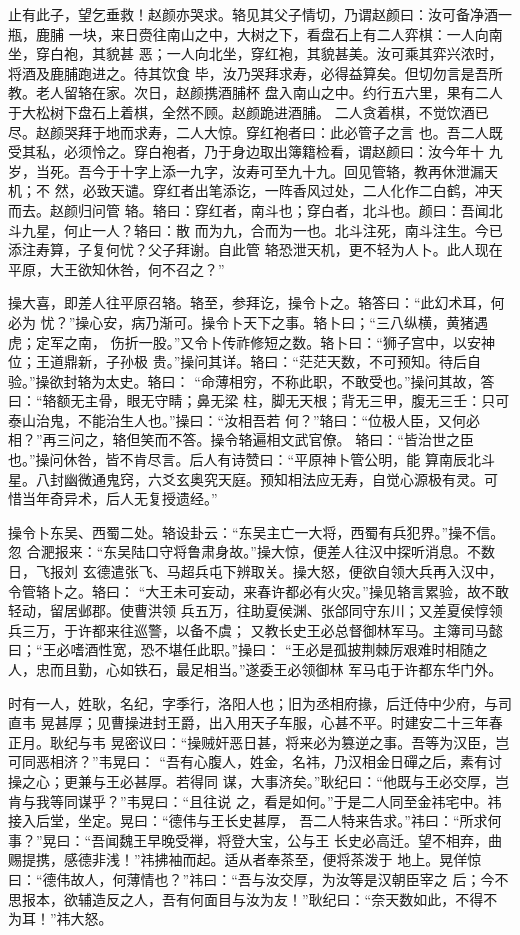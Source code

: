 止有此子，望乞垂救！赵颜亦哭求。辂见其父子情切，乃谓赵颜曰：汝可备净酒一瓶，鹿脯
一块，来日赍往南山之中，大树之下，看盘石上有二人弈棋：一人向南坐，穿白袍，其貌甚
恶；一人向北坐，穿红袍，其貌甚美。汝可乘其弈兴浓时，将酒及鹿脯跑进之。待其饮食
毕，汝乃哭拜求寿，必得益算矣。但切勿言是吾所教。老人留辂在家。次日，赵颜携酒脯杯
盘入南山之中。约行五六里，果有二人于大松树下盘石上着棋，全然不顾。赵颜跪进酒脯。
二人贪着棋，不觉饮酒已尽。赵颜哭拜于地而求寿，二人大惊。穿红袍者曰：此必管子之言
也。吾二人既受其私，必须怜之。穿白袍者，乃于身边取出簿籍检看，谓赵颜曰：汝今年十
九岁，当死。吾今于十字上添一九字，汝寿可至九十九。回见管辂，教再休泄漏天机；不
然，必致天谴。穿红者出笔添讫，一阵香风过处，二人化作二白鹤，冲天而去。赵颜归问管
辂。辂曰：穿红者，南斗也；穿白者，北斗也。颜曰：吾闻北斗九星，何止一人？辂曰：散
而为九，合而为一也。北斗注死，南斗注生。今已添注寿算，子复何忧？父子拜谢。自此管
辂恐泄天机，更不轻为人卜。此人现在平原，大王欲知休咎，何不召之？”

操大喜，即差人往平原召辂。辂至，参拜讫，操令卜之。辂答曰：“此幻术耳，何必为
忧？”操心安，病乃渐可。操令卜天下之事。辂卜曰；“三八纵横，黄猪遇虎；定军之南，
伤折一股。”又令卜传祚修短之数。辂卜曰：“狮子宫中，以安神位；王道鼎新，子孙极
贵。”操问其详。辂曰：“茫茫天数，不可预知。待后自验。”操欲封辂为太史。辂曰：
“命薄相穷，不称此职，不敢受也。”操问其故，答曰：“辂额无主骨，眼无守睛；鼻无梁
柱，脚无天根；背无三甲，腹无三壬：只可泰山治鬼，不能治生人也。”操曰：“汝相吾若
何？”辂曰：“位极人臣，又何必相？”再三问之，辂但笑而不答。操令辂遍相文武官僚。
辂曰：“皆治世之臣也。”操问休咎，皆不肯尽言。后人有诗赞曰：“平原神卜管公明，能
算南辰北斗星。八封幽微通鬼窍，六爻玄奥究天庭。预知相法应无寿，自觉心源极有灵。可
惜当年奇异术，后人无复授遗经。”

操令卜东吴、西蜀二处。辂设卦云：“东吴主亡一大将，西蜀有兵犯界。”操不信。忽
合淝报来：“东吴陆口守将鲁肃身故。”操大惊，便差人往汉中探听消息。不数日，飞报刘
玄德遣张飞、马超兵屯下辨取关。操大怒，便欲自领大兵再入汉中，令管辂卜之。辂曰：
“大王未可妄动，来春许都必有火灾。”操见辂言累验，故不敢轻动，留居邺郡。使曹洪领
兵五万，往助夏侯渊、张郃同守东川；又差夏侯惇领兵三万，于许都来往巡警，以备不虞；
又教长史王必总督御林军马。主簿司马懿曰；“王必嗜酒性宽，恐不堪任此职。”操曰：
“王必是孤披荆棘厉艰难时相随之人，忠而且勤，心如铁石，最足相当。”遂委王必领御林
军马屯于许都东华门外。

时有一人，姓耿，名纪，字季行，洛阳人也；旧为丞相府掾，后迁侍中少府，与司直韦
晃甚厚；见曹操进封王爵，出入用天子车服，心甚不平。时建安二十三年春正月。耿纪与韦
晃密议曰：“操贼奸恶日甚，将来必为篡逆之事。吾等为汉臣，岂可同恶相济？”韦晃曰：
“吾有心腹人，姓金，名祎，乃汉相金日磾之后，素有讨操之心；更兼与王必甚厚。若得同
谋，大事济矣。”耿纪曰：“他既与王必交厚，岂肯与我等同谋乎？”韦晃曰：“且往说
之，看是如何。”于是二人同至金祎宅中。祎接入后堂，坐定。晃曰：“德伟与王长史甚厚，
吾二人特来告求。”祎曰：“所求何事？”晃曰：“吾闻魏王早晚受禅，将登大宝，公与王
长史必高迁。望不相弃，曲赐提携，感德非浅！”祎拂袖而起。适从者奉茶至，便将茶泼于
地上。晃佯惊曰：“德伟故人，何薄情也？”祎曰：“吾与汝交厚，为汝等是汉朝臣宰之
后；今不思报本，欲辅造反之人，吾有何面目与汝为友！”耿纪曰：“奈天数如此，不得不
为耳！”祎大怒。

